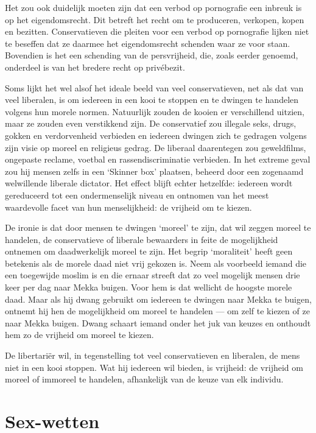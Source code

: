 \documentclass[
  a5paper,
  smalldemyvopaper,10pt,twoside,onecolumn,openright,extrafontsizes,hidelinks]{memoir}
\begin{document}
Het zou ook duidelijk moeten zijn dat een verbod op pornografie een
inbreuk is op het eigendomsrecht. Dit betreft het recht om te
produceren, verkopen, kopen en bezitten. Conservatieven die pleiten voor
een verbod op pornografie lijken niet te beseffen dat ze daarmee het
eigendomsrecht schenden waar ze voor staan. Bovendien is het een
schending van de persvrijheid, die, zoals eerder genoemd, onderdeel is
van het bredere recht op privébezit.

Soms lijkt het wel alsof het ideale beeld van veel conservatieven, net
als dat van veel liberalen, is om iedereen in een kooi te stoppen en te
dwingen te handelen volgens hun morele normen. Natuurlijk zouden de
kooien er verschillend uitzien, maar ze zouden even verstikkend zijn. De
conservatief zou illegale seks, drugs, gokken en verdorvenheid verbieden
en iedereen dwingen zich te gedragen volgens zijn visie op moreel en
religieus gedrag. De liberaal daarentegen zou geweldfilms, ongepaste
reclame, voetbal en rassendiscriminatie verbieden. In het extreme geval
zou hij mensen zelfs in een `Skinner box' plaatsen, beheerd door een
zogenaamd welwillende liberale dictator. Het effect blijft echter
hetzelfde: iedereen wordt gereduceerd tot een ondermenselijk niveau en
ontnomen van het meest waardevolle facet van hun menselijkheid: de
vrijheid om te kiezen.

De ironie is dat door mensen te dwingen `moreel' te zijn, dat wil zeggen
moreel te handelen, de conservatieve of liberale bewaarders in feite de
mogelijkheid ontnemen om daadwerkelijk moreel te zijn. Het begrip
`moraliteit' heeft geen betekenis als de morele daad niet vrij gekozen
is. Neem als voorbeeld iemand die een toegewijde moslim is en die ernaar
streeft dat zo veel mogelijk mensen drie keer per dag naar Mekka buigen.
Voor hem is dat wellicht de hoogste morele daad. Maar als hij dwang
gebruikt om iedereen te dwingen naar Mekka te buigen, ontnemt hij hen de
mogelijkheid om moreel te handelen --- om zelf te kiezen of ze naar
Mekka buigen. Dwang schaart iemand onder het juk van keuzes en onthoudt
hem zo de vrijheid om moreel te kiezen.

De libertariër wil, in tegenstelling tot veel conservatieven en
liberalen, de mens niet in een kooi stoppen. Wat hij iedereen wil
bieden, is vrijheid: de vrijheid om moreel of immoreel te handelen,
afhankelijk van de keuze van elk individu.

\section{Sex-wetten}\label{sex-wetten}
\end{document}
